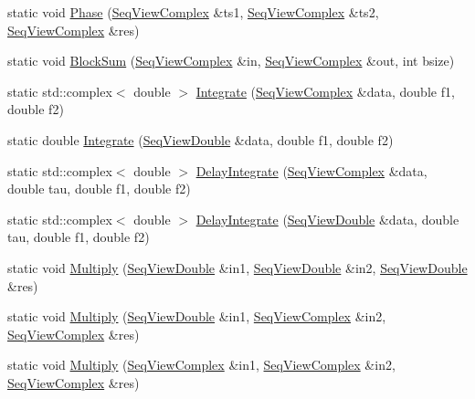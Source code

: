 \begin{Indent}
\begin{DoxyCompactItemize}
\item 
static void \hyperlink{classtsa_1_1_view_util_aaffeb0990bd91866c40a10f25cda7f5c}{Phase} (\hyperlink{namespacetsa_ab32775c889b53c40fa83939f22372b75}{Seq\+View\+Complex} \&ts1, \hyperlink{namespacetsa_ab32775c889b53c40fa83939f22372b75}{Seq\+View\+Complex} \&ts2, \hyperlink{namespacetsa_ab32775c889b53c40fa83939f22372b75}{Seq\+View\+Complex} \&res)
\item 
static void \hyperlink{classtsa_1_1_view_util_acc21d93e9a9f6c6522adade5fd6e6f1f}{Block\+Sum} (\hyperlink{namespacetsa_ab32775c889b53c40fa83939f22372b75}{Seq\+View\+Complex} \&in, \hyperlink{namespacetsa_ab32775c889b53c40fa83939f22372b75}{Seq\+View\+Complex} \&out, int bsize)
\item 
static std\+::complex$<$ double $>$ \hyperlink{classtsa_1_1_view_util_a6ce61da5cef5306cc1cbbf715c39871c}{Integrate} (\hyperlink{namespacetsa_ab32775c889b53c40fa83939f22372b75}{Seq\+View\+Complex} \&data, double f1, double f2)
\item 
static double \hyperlink{classtsa_1_1_view_util_af4179aaa62db551eebda4a49e0232c12}{Integrate} (\hyperlink{namespacetsa_ac599574bcc094eda25613724b8f3ca9e}{Seq\+View\+Double} \&data, double f1, double f2)
\item 
static std\+::complex$<$ double $>$ \hyperlink{classtsa_1_1_view_util_afdc977e523a31a8f009fb338d7f9937f}{Delay\+Integrate} (\hyperlink{namespacetsa_ab32775c889b53c40fa83939f22372b75}{Seq\+View\+Complex} \&data, double tau, double f1, double f2)
\item 
static std\+::complex$<$ double $>$ \hyperlink{classtsa_1_1_view_util_a05ade4e87492c28990eaa5d59f023e74}{Delay\+Integrate} (\hyperlink{namespacetsa_ac599574bcc094eda25613724b8f3ca9e}{Seq\+View\+Double} \&data, double tau, double f1, double f2)
\item 
static void \hyperlink{classtsa_1_1_view_util_ad9984dcf61bae9647aac60f0d3141d71}{Multiply} (\hyperlink{namespacetsa_ac599574bcc094eda25613724b8f3ca9e}{Seq\+View\+Double} \&in1, \hyperlink{namespacetsa_ac599574bcc094eda25613724b8f3ca9e}{Seq\+View\+Double} \&in2, \hyperlink{namespacetsa_ac599574bcc094eda25613724b8f3ca9e}{Seq\+View\+Double} \&res)
\item 
static void \hyperlink{classtsa_1_1_view_util_a3428ec74c858edbdea18d034f9afb761}{Multiply} (\hyperlink{namespacetsa_ac599574bcc094eda25613724b8f3ca9e}{Seq\+View\+Double} \&in1, \hyperlink{namespacetsa_ab32775c889b53c40fa83939f22372b75}{Seq\+View\+Complex} \&in2, \hyperlink{namespacetsa_ab32775c889b53c40fa83939f22372b75}{Seq\+View\+Complex} \&res)
\item 
static void \hyperlink{classtsa_1_1_view_util_adb65d5e06f5ed0bec2bad29ca314aefc}{Multiply} (\hyperlink{namespacetsa_ab32775c889b53c40fa83939f22372b75}{Seq\+View\+Complex} \&in1, \hyperlink{namespacetsa_ab32775c889b53c40fa83939f22372b75}{Seq\+View\+Complex} \&in2, \hyperlink{namespacetsa_ab32775c889b53c40fa83939f22372b75}{Seq\+View\+Complex} \&res)
\end{DoxyCompactItemize}
\end{Indent}


